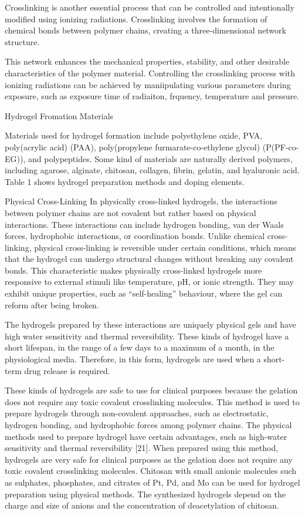 \documentclass[../../main-notes.tex]{subfiles}
\begin{document}
Crosslinking is another essential process that can be controlled and intentionally modified using ionizing radiations. 
Crosslinking involves the formation of chemical bonds between polymer chains, creating a three-dimensional network structure. 

This network enhances the mechanical properties, stability, and other desirable characteristics of the polymer material. 
Controlling the crosslinking process with ionizing radiations can be achieved by maniipulating various parameters during exposure, such as exposure time of radiaiton, frquency, temperature and pressure.

Hydrogel Fromation Materials

Materials used for hydrogel formation include polyethylene oxide, PVA, poly(acrylic acid) (PAA), poly(propylene furmarate-co-ethylene glycol) (P(PF-co-EG)), and polypeptides. 
Some kind of materials are naturally derived polymers, including agarose, alginate, chitosan, collagen, fibrin, gelatin, and hyaluronic acid. 
Table 1 shows hydrogel preparation methods and doping elements.

Physical Cross-Linking
In physically cross-linked hydrogels, the interactions between polymer chains are not covalent but rather based on physical interactions. 
These interactions can include hydrogen bonding, van der Waals forces, hydrophobic interactions, or coordination bonds. 
Unlike chemical cross-linking, physical cross-linking is reversible under certain conditions, which means that the hydrogel can undergo structural changes without breaking any covalent bonds. 
This characteristic makes physically cross-linked hydrogels more responsive to external stimuli like temperature, pH, or ionic strength. 
They may exhibit unique properties, such as “self-healing” behaviour, where the gel can reform after being broken. 

The hydrogels prepared by these interactions are uniquely physical gels and have high water sensitivity and thermal reversibility. 
These kinds of hydrogel have a short lifespan, in the range of a few days to a maximum of a month, in the physiological media. 
Therefore, in this form, hydrogels are used when a short-term drug release is required. 

These kinds of hydrogels are safe to use for clinical purposes because the gelation does not require any toxic covalent crosslinking molecules. 
This method is used to prepare hydrogels through non-covalent approaches, such as electrostatic, hydrogen bonding, and hydrophobic forces among polymer chains. 
The physical methods used to prepare hydrogel have certain advantages, such as high-water sensitivity and thermal reversibility [21]. 
When prepared using this method, hydrogels are very safe for clinical purposes as the gelation does not require any toxic covalent crosslinking molecules. 
Chitosan with small anionic molecules such as sulphates, phosphates, and citrates of Pt, Pd, and Mo can be used for hydrogel preparation using physical methods. 
The synthesized hydrogels depend on the charge and size of anions and the concentration of deacetylation of chitosan.
\end{document}
